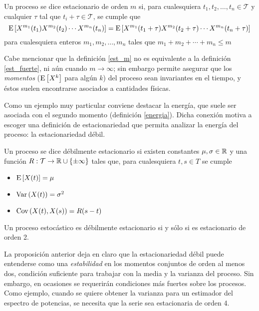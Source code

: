 \begin{definicion}
Un proceso \xt se dice estacionario de orden $m$ si, para cualesquiera
$t_1, t_2, \dots, t_n \in \mathcal{T}$ y cualquier $\tau$ tal que $t_i + \tau \in \mathcal{T}$,
se cumple que
\begin{equation*}
\mathrm{E}\left[ X^{m_1}(t_1)X^{m_2}(t_2)\cdots X^{m_n}(t_n) \right] =
\mathrm{E}\left[ X^{m_1}(t_1+\tau)X^{m_2}(t_2+\tau)\cdots X^{m_n}(t_n+\tau) \right]
\end{equation*}
para cualesquiera enteros $m_1, m_2, \dots, m_n$ tales que $m_1+m_2+\cdots+m_n \leq m$
\label{est_m}
\end{definicion}

Cabe mencionar que la definición \ref{est_m} no es equivalente a la definición \ref{est_fuerte}, ni
aún cuando $m\rightarrow \infty$; sin embargo permite asegurar que los \textit{momentos} 
($\mathrm{E}\left[ X^{k} \right]$ para algún $k$) del proceso sean invariantes en el tiempo, y éstos suelen encontrarse
asociados a cantidades físicas.

Como un ejemplo muy particular conviene destacar la energía, que suele ser asociada con el segundo
momento (definición \ref{energia}). 
%
Dicha conexión motiva a escoger una definición de estacionariedad que permita analizar la energía 
del proceso: la estacionariedad débil.

\begin{definicion}
Un proceso \xt se dice débilmente estacionario si existen constantes $\mu, \sigma \in \mathbb{R}$ y una 
función $R : \mathcal{T} \rightarrow \mathbb{R} \cup \{ \pm \infty \} $ tales que, para cualesquiera $t, s \in T$ se 
cumple
\begin{itemize}
\item $\mathrm{E}\left[ X(t) \right] = \mu$
\item $\mathrm{Var}\left( X(t) \right) = \sigma^{2}$
\item $\mathrm{Cov}\left( X(t),X(s) \right) = R(s-t)$
\end{itemize}
\end{definicion}

\begin{proposicion}
Un proceso estocástico es débilmente estacionario si y sólo si es estacionario de orden 2.
\end{proposicion}

La proposición anterior deja en claro que la estacionariedad débil puede entenderse como una \textit{estabilidad} en los momentos conjuntos de orden al menos dos, condición suficiente para trabajar con la media y la varianza del proceso.
%
Sin embargo, en ocasiones se requerirán condiciones más fuertes sobre los procesos. Como ejemplo, cuando se quiere obtener la varianza para un estimador del espectro de potencias, se necesita que la serie sea estacionaria de orden 4. 

